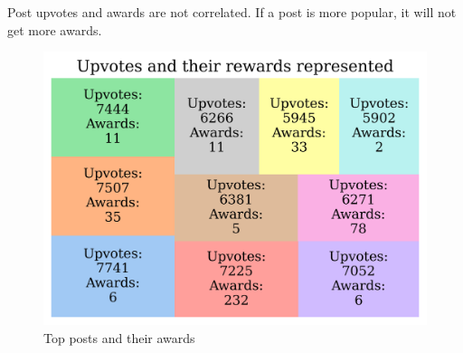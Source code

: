 Post upvotes and awards are not correlated. If a post is more popular, it will not get more awards. 
\begin{figure}[H]
\includegraphics[scale=0.90]{img/A1/ups_treemap.png}
\centering
\caption{Top posts and their awards}
\label{fig:ups_treemap}
\end{figure}